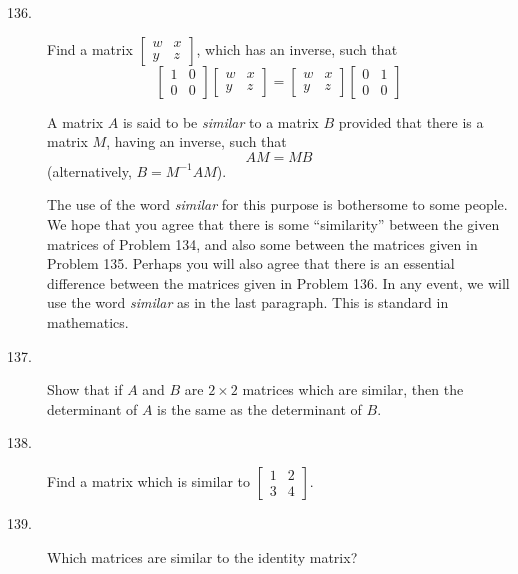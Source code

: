 \documentclass{article}
\begin{document}
\begin{description}
  \item[136.] Find a matrix $\begin{bmatrix} w & x \\ y & z \end{bmatrix}$, which has an inverse, such that
    \begin{equation*}
      \begin{bmatrix} 1 & 0 \\ 0 & 0 \end{bmatrix}  \begin{bmatrix} w & x \\ y & z \end{bmatrix}
      = \begin{bmatrix} w & x \\ y & z \end{bmatrix}  \begin{bmatrix} 0 & 1 \\ 0 & 0 \end{bmatrix}
    \end{equation*}

  \item[] A matrix $A$ is said to be \emph{similar} to a matrix $B$ provided that there is a matrix $M$, having an inverse, such that
    \begin{equation*}
    AM = MB
    \end{equation*}
    (alternatively, $B = M^{-1}AM$).

    The use of the word \emph{similar} for this purpose is bothersome to some people. We hope that you agree that there is some ``similarity'' between the given matrices of Problem 134, and also some between the matrices given in Problem 135. Perhaps you will also agree that there is an essential difference between the matrices given in Problem 136. In any event, we will use the word \emph{similar} as in the last paragraph. This is standard in mathematics.

  \item[137.] Show that if $A$ and $B$ are $2 \times 2$ matrices which are similar, then the determinant of $A$ is the same as the determinant of $B$.

  \item[138.] Find a matrix which is similar to $\begin{bmatrix} 1 & 2 \\ 3 & 4 \end{bmatrix}$.

  \item[139.] Which matrices are similar to the identity matrix?


\end{description}
\end{document}
